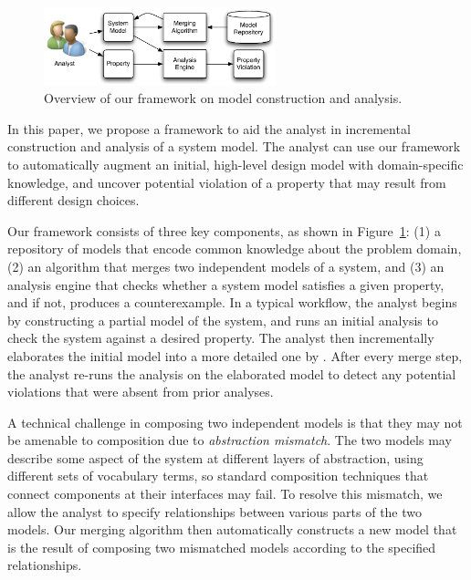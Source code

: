 \begin{figure}[!t]
\centering
\includegraphics[width=0.60\textwidth]{diagrams/overview}
\caption{Overview of our framework on model construction and analysis.}
\label{fig-overview}
\end{figure}

In this paper, we propose a framework to aid the analyst in
incremental construction and analysis of a system model. The analyst
can use our framework to automatically augment an initial, high-level
design model with domain-specific knowledge, and uncover potential
violation of a property that may result from different design choices.

Our framework consists of three key components, as shown in
Figure~\ref{fig-overview}: (1) a repository of models that encode
common knowledge about the problem domain, (2) an algorithm that
merges two independent models of a system, and (3) an analysis engine
that checks whether a system model satisfies a given property, and if
not, produces a counterexample. In a typical workflow, the analyst
begins by constructing a partial model of the system, and runs an
initial analysis to check the system against a desired property. The
analyst then incrementally elaborates the initial model into a more
detailed one by . After every merge step, the
analyst re-runs the analysis on the elaborated model to detect any
potential violations that were absent from prior analyses.

A technical challenge in composing two independent models is that they
may not be amenable to composition due to \textit{abstraction
  mismatch}. The two models may describe some aspect of the system
at different layers of abstraction, using different sets of vocabulary
terms, so standard composition techniques that connect components at
their interfaces may fail. To resolve this mismatch, we allow the
analyst to specify relationships between various parts of the two
models. Our merging algorithm then automatically constructs a new
model that is the result of composing two mismatched models according
to the specified relationships.

